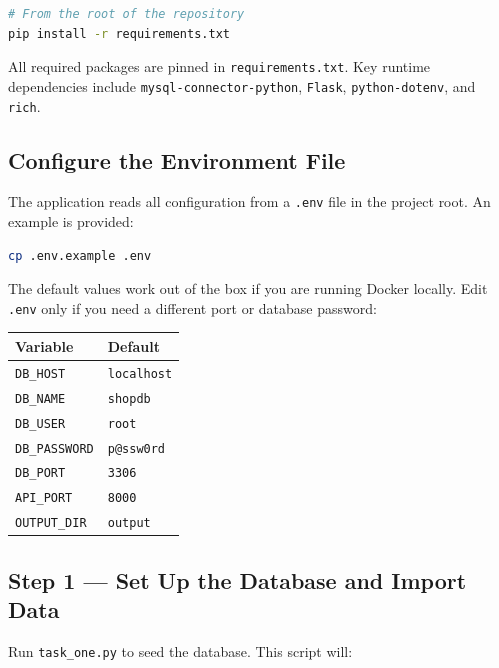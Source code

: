 \documentclass[12pt,a4paper]{article}
\begin{document}
\begin{lstlisting}[language=bash, caption={Install Python dependencies}]
# From the root of the repository
pip install -r requirements.txt
\end{lstlisting}

All required packages are pinned in \texttt{requirements.txt}. Key runtime
dependencies include \texttt{mysql-connector-python}, \texttt{Flask},
\texttt{python-dotenv}, and \texttt{rich}.

\subsection{Configure the Environment File}

The application reads all configuration from a \texttt{.env} file in the
project root. An example is provided:

\begin{lstlisting}[language=bash, caption={Create your \texttt{.env} file}]
cp .env.example .env
\end{lstlisting}

The default values work out of the box if you are running Docker locally.
Edit \texttt{.env} only if you need a different port or database password:

\begin{center}
\begin{tabular}{ll}
\toprule
\textbf{Variable} & \textbf{Default} \\
\midrule
\texttt{DB\_HOST}     & \texttt{localhost} \\
\texttt{DB\_NAME}     & \texttt{shopdb}    \\
\texttt{DB\_USER}     & \texttt{root}      \\
\texttt{DB\_PASSWORD} & \texttt{p@ssw0rd}  \\
\texttt{DB\_PORT}     & \texttt{3306}      \\
\texttt{API\_PORT}    & \texttt{8000}      \\
\texttt{OUTPUT\_DIR}  & \texttt{output}    \\
\bottomrule
\end{tabular}
\end{center}

\subsection{Step 1 --- Set Up the Database and Import Data}

Run \texttt{task\_one.py} to seed the database. This script will:
\end{document}
